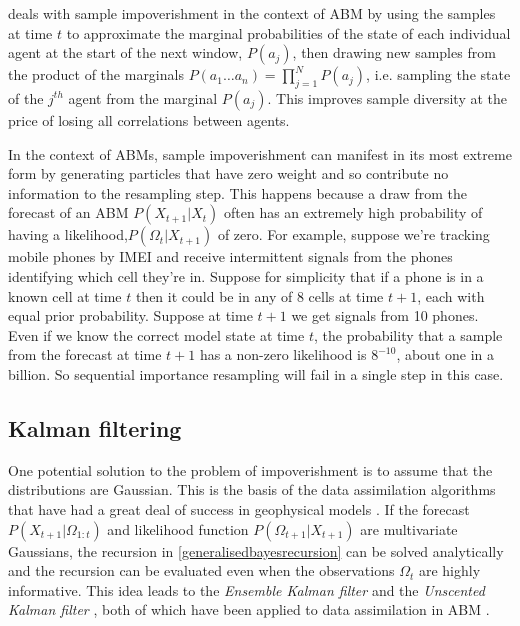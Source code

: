 \documentclass{article}
\begin{document}
\citet{wang_data_2015} deals with sample impoverishment in the context of ABM by using the samples at time $t$ to approximate the marginal probabilities of the state of each individual agent at the start of the next window, $P(a_j)$, then drawing new samples from the product of the marginals $P(a_1 \dots a_n) = \prod_{j=1}^NP(a_j)$, i.e. sampling the state of the $j^{th}$ agent from the marginal $P(a_j)$. This improves sample diversity at the price of losing all correlations between agents. 

In the context of ABMs, sample impoverishment can manifest in its most extreme form by generating particles that have zero weight and so contribute no information to the resampling step. This happens because a draw from the forecast of an ABM $P(X_{t+1}|X_t)$ often has an extremely high probability of having a likelihood,$P(\Omega_t|X_{t+1})$ of zero. For example, suppose we're tracking mobile phones by IMEI and receive intermittent signals from the phones identifying which cell they're in. Suppose for simplicity that if a phone is in a known cell at time $t$ then it could be in any of 8 cells at time $t+1$, each with equal prior probability. Suppose at time $t+1$ we get signals from 10 phones. Even if we know the correct model state at time $t$, the probability that a sample from the forecast at time $t+1$ has a non-zero likelihood is $8^{-10}$, about one in a billion. So sequential importance resampling will fail in a single step in this case.

\subsection{Kalman filtering}
One potential solution to the problem of impoverishment is to assume that the distributions are Gaussian. This is the basis of the data assimilation algorithms that have had a great deal of success in geophysical models \citep*{carrassi2018data, talagrand_assimilation_1997, kalnay_atmospheric_2003, lewis_dynamic_2006}. If the forecast $P(X_{t+1}|\Omega_{1:t})$ and likelihood function $P(\Omega_{t+1}|X_{t+1})$ are multivariate Gaussians, the recursion in \eqref{generalisedbayesrecursion} can be solved analytically and the recursion can be evaluated even when the observations $\Omega_t$ are highly informative. This idea leads to the \textit{Ensemble Kalman filter} \citep{evensen2003ensemble} and the \textit{Unscented Kalman filter} \citep{wan2001unscented}, both of which have been applied to data assimilation in ABM \citep*{ward_dynamic_2016, clay_realtime_2020}.
\end{document}
